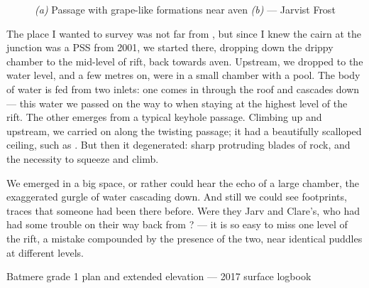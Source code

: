 \begin{figure*}[t!]
	\checkoddpage \ifoddpage \forcerectofloat \else \forceversofloat \fi
	\centering
	\begin{subfigure}[t]{0.328\textwidth}
		\centering
		 \caption{}\label{povezava formation}
	\end{subfigure}
  	 \hfill
   	 \begin{subfigure}[t]{0.662\textwidth}
        		\centering
        		\caption{} \label{mary cafe tanguy}
        \end{subfigure}
	\caption{
	 	  \textit{(a)} Passage with grape-like formations near \protect{} aven
   		 \textit{(b)} \protect{} --- Jarvist Frost}
\end{figure*}
	


	The place I wanted to survey was not far from , but since I knew the cairn at the junction was a PSS from 2001, we started there, dropping down the drippy chamber to the mid-level of rift, back towards  aven. Upstream, we dropped to the water level, and a few metres on, were in a small chamber with a pool. The body of water is fed from two inlets: one comes in through the roof and cascades down --- this water we passed on the way to  when staying at the highest level of the rift. The other emerges from a typical keyhole passage. Climbing up and upstream, we carried on along the twisting passage; it had a beautifully scalloped ceiling, such as . But then it degenerated: sharp protruding blades of rock, and the necessity to squeeze and climb. 
	
	We emerged in a big space, or rather could hear the echo of a large chamber, the exaggerated gurgle of water cascading down. And still we could see footprints, traces that someone had been there before. Were they Jarv and Clare's, who had had some trouble on their way back from ? --- it is so easy to miss one level of the rift, a mistake compounded by the presence of the two, near identical puddles at different levels. 
	
\begin{survey}[b!]
\checkoddpage \ifoddpage \forcerectofloat \else \forceversofloat \fi
 \centering
{}
\caption[Batmere plan and (grade 1)]{Batmere grade 1 plan and extended elevation --- 2017 surface logbook}
\end{survey}

